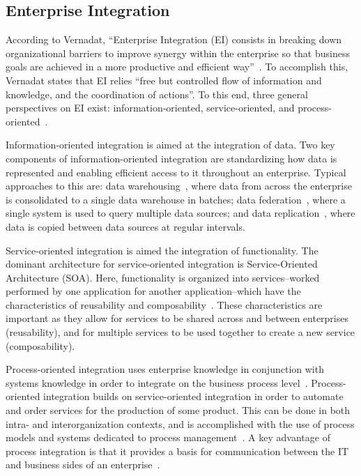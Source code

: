 \subsection{Enterprise Integration}

According to Vernadat, ``Enterprise Integration (EI) consists in breaking down organizational barriers to improve synergy within the enterprise so that business goals are achieved in a more productive and efficient way''~\cite{Vernadat200215}. To accomplish this, Vernadat states that EI relies ``free but controlled flow of information and knowledge, and the coordination of actions''. To this end, three general perspectives on EI exist: information-oriented, service-oriented, and process-oriented~\cite{zdravkovic2012}.

Information-oriented integration is aimed at the integration of data. Two key components of information-oriented integration are standardizing how data is represented and enabling efficient access to it throughout an enterprise. Typical approaches to this are: data warehousing~\cite{kimball2006data}, where data from across the enterprise is consolidated to a single data warehouse in batches; data federation~\cite{haas2002data}, where a single system is used to query multiple data sources; and data replication~\cite{wiesmann2000database}, where data is copied between data sources at regular intervals. 

Service-oriented integration is aimed the integration of functionality. The dominant architecture for service-oriented integration is Service-Oriented Architecture (SOA). Here, functionality is organized into services--worked performed by one application for another application--which have the characteristics of  reusability and composability~\cite{roshen2009soa}. These characteristics are important as they allow for services to be shared across and between enterprises (reusability), and for multiple services to be used together to create a new service (composability). 

Process-oriented integration uses enterprise knowledge in conjunction with systems knowledge in order to integrate on the business process level~\cite{Vernadat200215}. Process-oriented integration builds on service-oriented integration in order to automate and order services for the production of some product. This can be done in both intra- and interorganization contexts, and is accomplished with the use of process models and systems dedicated to process management~\cite{dumas2005process}. A key advantage of process integration is that it provides a basis for communication between the IT and business sides of an enterprise~\cite{dumas2005process}.